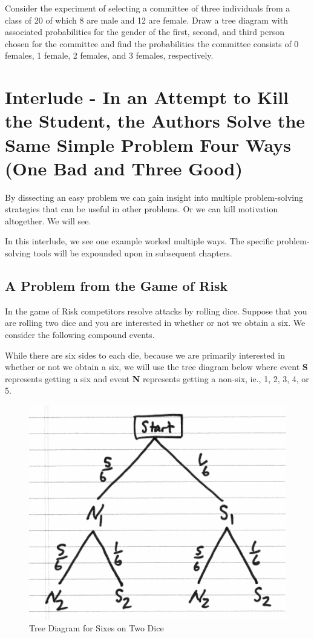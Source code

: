 \documentclass[]{book}
\theoremstyle{definition}
\theoremstyle{definition}
\theoremstyle{definition}
\theoremstyle{remark}
\begin{document}
Consider the experiment of selecting a committee of three individuals
from a class of 20 of which 8 are male and 12 are female. Draw a tree
diagram with associated probabilities for the gender of the first,
second, and third person chosen for the committee and find the
probabilities the committee consists of 0 females, 1 female, 2 females,
and 3 females, respectively.

\chapter{Interlude - In an Attempt to Kill the Student, the Authors
Solve the Same Simple Problem Four Ways (One Bad and Three
Good)}\label{kill_the_student}

By dissecting an easy problem we can gain insight into multiple
problem-solving strategies that can be useful in other problems. Or we
can kill motivation altogether. We will see.

In this interlude, we see one example worked multiple ways. The specific
problem-solving tools will be expounded upon in subsequent chapters.

\section{A Problem from the Game of Risk}\label{risk_problem}

In the game of Risk competitors resolve attacks by rolling dice. Suppose
that you are rolling two dice and you are interested in whether or not
we obtain a six. We consider the following compound events.

While there are six sides to each die, because we are primarily
interested in whether or not we obtain a six, we will use the tree
diagram below where event \textbf{S} represents getting a six and event
\textbf{N} represents getting a non-six, ie., 1, 2, 3, 4, or 5.

\begin{figure}

{\centering \includegraphics[width=0.6\linewidth]{01-basics-figures/tree_two_dice_sixes} 

}

\caption{Tree Diagram for Sixes on Two Dice}\label{fig:nice-fig-41}
\end{figure}
\end{document}
